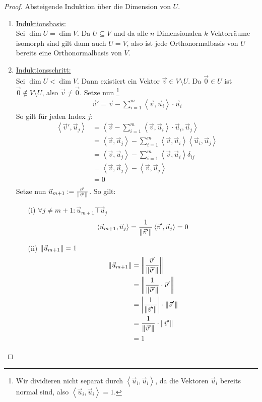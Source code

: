 \documentclass{report}
\newcommand{\ul}[1]{\underline{#1}}
\renewcommand{\vu}{\vec{u}}
\newcommand{\vv}{\vec{v}}
\newcommand{\vz}{\vec{0}}
\newcommand{\scalar}[2]{\left\langle #1, #2 \right\rangle}
\begin{document}
\begin{proof}
 Absteigende Induktion über die Dimension von $U$.
 \begin{enumerate}
  \item \ul{Induktionsbasis:}\\
  Sei $\dim U = \dim V$. Da $U \subseteq V$ und da alle $n$-Dimensionalen $k$-Vektorräume isomorph sind gilt dann auch $U = V$, also ist jede Orthonormalbasis von $U$ bereits eine Orthonormalbasis von $V$.
  \item \ul{Induktionsschritt:}\\
  Sei $\dim U < \dim V$. Dann existiert ein Vektor $\vv \in V \setminus U$. Da $\vz \in U$ ist $\vz \notin V \setminus U$, also $\vv \neq \vz$. Setze nun \footnote{Wir dividieren nicht separat durch $\scalar{\vu_i}{\vu_i}$, da die Vektoren $\vu_i$ bereits normal sind, also $\scalar{\vu_i}{\vu_i} = 1$.}
  \begin{align*}
   \vv' = \vv - \sum_{i=1}^m \scalar{\vv}{\vu_i} \cdot \vu_i
  \end{align*}
  So gilt für jeden Index $j$:
  \begin{align*}
   \scalar{\vv'}{\vu_j} 
   &= \scalar{\vv- \sum_{i=1}^m \scalar{\vv}{\vu_i} \cdot \vu_i}{\vu_j}\\
   &= \scalar{\vv}{\vu_j} - \sum_{i=1}^m \scalar{\vv}{\vu_i} \scalar{\vu_i}{\vu_j}\\
   &= \scalar{\vv}{\vu_j} - \sum_{i=1}^m \scalar{\vv}{\vu_i} \delta_{ij}\\
   &= \scalar{\vv}{\vu_j} - \scalar{\vv}{\vu_j}\\
   &= 0\\
  \end{align*}
  Setze nun $\vu_{m+1} := \frac{\vv'}{\norm{\vv'}}$. So gilt:
  \begin{enumerate}
  \item[(i)] $\forall j \neq {m+1} : \vu_{m+1} \top \vu_j$
  \begin{align*}
   \scalar{\vu_{m+1}}{\vu_j} = \frac{1}{\norm{\vv'}} \scalar{\vv'}{\vu_j} = 0
  \end{align*}
  \item[(ii)] $\norm{\vu_{m+1}} = 1$
  \begin{align*}
   \norm{\vu_{m+1}} 
   &= \norm{\frac{\vv'}{\norm{\vv'}}}\\
   &= \norm{\frac{1}{\norm{\vv'}} \cdot \vv'}\\
   &= \abs{\frac{1}{\norm{\vv'}}} \cdot \norm{\vv'}\\
   &= \frac{1}{\norm{\vv'}} \cdot \norm{\vv'}\\
   &= 1\\
  \end{align*}
  \end{enumerate}
  
 \end{enumerate}
\end{proof}
\end{document}
